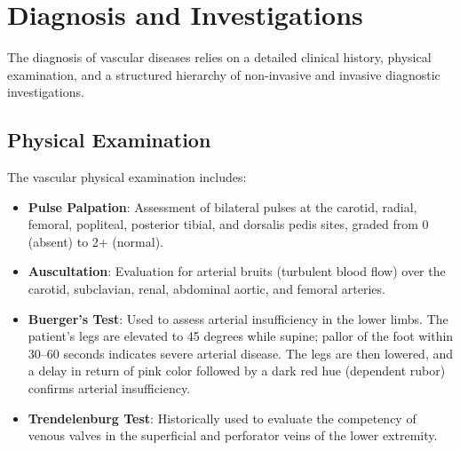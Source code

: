 \section*{Diagnosis and Investigations}
The diagnosis of vascular diseases relies on a detailed clinical history, physical examination, and a structured hierarchy of non-invasive and invasive diagnostic investigations.

\subsection*{Physical Examination}
The vascular physical examination includes:
\begin{itemize}
    \item \textbf{Pulse Palpation}: Assessment of bilateral pulses at the carotid, radial, femoral, popliteal, posterior tibial, and dorsalis pedis sites, graded from 0 (absent) to 2+ (normal).
    \item \textbf{Auscultation}: Evaluation for arterial bruits (turbulent blood flow) over the carotid, subclavian, renal, abdominal aortic, and femoral arteries.
    \item \textbf{Buerger's Test}: Used to assess arterial insufficiency in the lower limbs. The patient's legs are elevated to 45 degrees while supine; pallor of the foot within 30--60 seconds indicates severe arterial disease. The legs are then lowered, and a delay in return of pink color followed by a dark red hue (dependent rubor) confirms arterial insufficiency.
    \item \textbf{Trendelenburg Test}: Historically used to evaluate the competency of venous valves in the superficial and perforator veins of the lower extremity.
\end{itemize}

